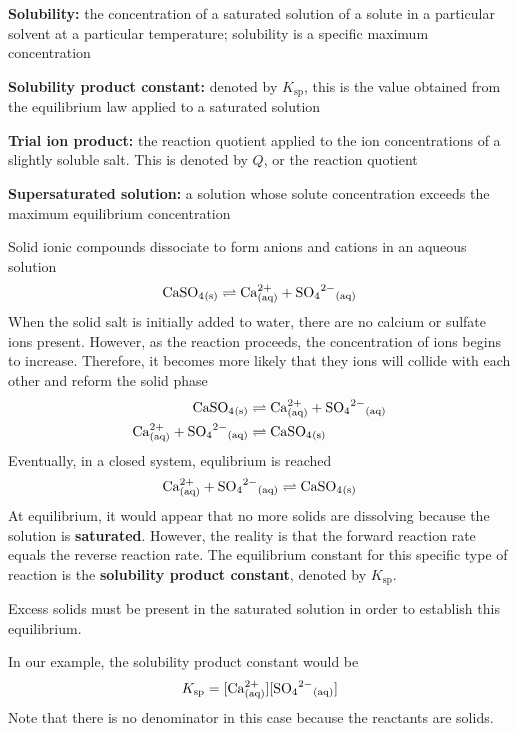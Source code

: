 \begin{bulleted-list}
    \item \textbf{Solubility:} the concentration of a saturated solution of a solute in a
        particular solvent at a particular temperature; solubility is a specific maximum
        concentration
    \item \textbf{Solubility product constant:} denoted by $K_\mathrm{sp}$, this is the value
        obtained from the equilibrium law applied to a saturated solution
    \item \textbf{Trial ion product:} the reaction quotient applied to the ion concentrations
        of a slightly soluble salt. This is denoted by $Q$, or the reaction quotient
    \item \textbf{Supersaturated solution:} a solution whose solute concentration exceeds
        the maximum equilibrium concentration
\end{bulleted-list}

Solid ionic compounds dissociate to form anions and cations in an aqueous solution
\[
    \ch{CaSO4_{(s)}}\rightleftharpoons \ch{Ca^{2+}_{(aq)}}+\ch{SO4^{2-}_{(aq)}}
\]
When the solid salt is initially added to water, there are no calcium or sulfate ions present.
However, as the reaction proceeds, the concentration of ions begins to increase. Therefore, it
becomes more likely that they ions will collide with each other and reform the solid phase
\begin{align*}
    \ch{CaSO4_{(s)}}&\rightleftharpoons \ch{Ca^{2+}_{(aq)}}+\ch{SO4^{2-}_{(aq)}}\\
    \ch{Ca^{2+}_{(aq)}}+\ch{SO4^{2-}_{(aq)}}&\rightleftharpoons \ch{CaSO4_{(s)}}
\end{align*}
Eventually, in a closed system, equlibrium is reached
\[
    \ch{Ca^{2+}_{(aq)}}+\ch{SO4^{2-}_{(aq)}}\rightleftharpoons \ch{CaSO4_{(s)}}
\]
At equilibrium, it would appear that no more solids are dissolving because the solution is
\textbf{saturated}. However, the reality is that the forward reaction rate equals the reverse
reaction rate. The equilibrium constant for this specific type of reaction is the \textbf{solubility
product constant}, denoted by $K_\mathrm{sp}$.

\begin{important}
    Excess solids must be present in the saturated solution in order to establish this equilibrium.
\end{important}

In our example, the solubility product constant would be 
\[
    K_\mathrm{sp}=[\ch{Ca^{2+}_{(aq)}}][\ch{SO4^{2-}_{(aq)}}]
\]
Note that there is no denominator in this case because the reactants are solids.

